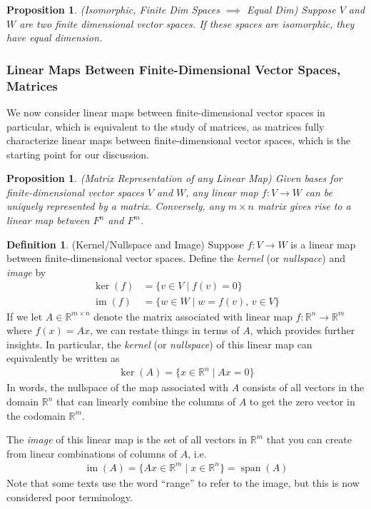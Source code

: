 \documentclass[12pt]{book}
\numberwithin{equation}{section} %
\theoremstyle{plain}
\newtheorem{prop}[thm]{Proposition}
\theoremstyle{definition}
\newtheorem{defn}[thm]{Definition}
\theoremstyle{remark}
\newcommand{\ra}{\rightarrow}
\newcommand{\Rn}{\mathbb{R}^n}
\newcommand{\Rm}{\mathbb{R}^m}
\newcommand{\Rmn}{\mathbb{R}^{m\times n}}
\begin{document}
\begin{prop}
\emph{(Isomorphic, Finite Dim Spaces $\implies$ Equal Dim)}
Suppose $V$ and $W$ are two finite dimensional vector spaces.
If these spaces are isomorphic, they have equal dimension.
\end{prop}


\subsubsection{Linear Maps Between Finite-Dimensional Vector Spaces, Matrices}

We now consider linear maps between finite-dimensional vector spaces in
particular, which is equivalent to the study of matrices, as matrices
fully characterize linear maps between finite-dimensional vector spaces,
which is the starting point for our discussion.

\begin{prop}
\emph{(Matrix Representation of any Linear Map)}
Given bases for finite-dimensional vector spaces $V$ and $W$,
any linear map
$f : V \ra W$
can be uniquely represented by a matrix.
Conversely, any $m \times n$ matrix gives rise to a linear map between
$F^n$ and $F^m$.
\end{prop}


\begin{defn}(Kernel/Nullspace and Image)
Suppose $f:V\ra W$ is a linear map between finite-dimensional
vector spaces.
Define the \emph{kernel} (or \emph{nullspace}) and \emph{image} by
\begin{align*}
  \operatorname{ker}(f)
  &=
  \{
    v\in V\;|\; f(v)=0
  \}
  \\
  \operatorname{im}(f)
  &=
  \{
    w\in W\;|\; w=f(v),\,v\in V
  \}
\end{align*}
If we let $A\in\Rmn$ denote the matrix associated with linear map
$f:\Rn\ra \Rm$ where $f(x)=Ax$, we can restate things in terms of $A$,
which provides further insights.
In particular, the \emph{kernel} (or \emph{nullspace}) of this linear
map can equivalently be written as
\begin{align*}
  \operatorname{ker}(A)
  = \{x\in\Rn\;|\; Ax = 0\}
\end{align*}
In words, the nullspace of the map associated with $A$ consists of all
vectors in the domain $\Rn$ that can linearly combine the columns of $A$
to get the zero vector in the codomain $\Rm$.

The \emph{image} of this linear map is the set of all vectors in $\Rm$
that you can create from linear combinations of columns of $A$, i.e.
\begin{align*}
  \operatorname{im}(A)
  =\{Ax\in\Rm\;|\; x\in\Rn\}
  =
  \operatorname{span}(A)
\end{align*}
Note that some texts use the word ``range'' to refer to the image, but
this is now considered poor terminology.
\end{defn}
\end{document}
